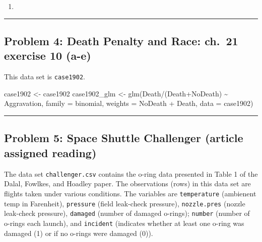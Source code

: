 \documentclass[
]{article}
\newenvironment{Shaded}{\begin{snugshade}}{\end{snugshade}}
\newcommand{\AttributeTok}[1]{\textcolor[rgb]{0.77,0.63,0.00}{#1}}
\newcommand{\FunctionTok}[1]{\textcolor[rgb]{0.00,0.00,0.00}{#1}}
\newcommand{\NormalTok}[1]{#1}
\newcommand{\OtherTok}[1]{\textcolor[rgb]{0.56,0.35,0.01}{#1}}
\newcommand{\SpecialCharTok}[1]{\textcolor[rgb]{0.00,0.00,0.00}{#1}}
\begin{document}
\begin{enumerate}
\def\labelenumi{\alph{enumi}.}
\setcounter{enumi}{1}
\item
  \newline
\end{enumerate}

\begin{center}\rule{0.5\linewidth}{0.5pt}\end{center}

\hypertarget{problem-4-death-penalty-and-race-ch.-21-exercise-10-a-e}{%
\subsection{Problem 4: Death Penalty and Race: ch.~21 exercise 10
(a-e)}\label{problem-4-death-penalty-and-race-ch.-21-exercise-10-a-e}}

This data set is \texttt{case1902}.

\begin{Shaded}
\begin{Highlighting}[]
\NormalTok{case1902 }\OtherTok{\textless{}{-}}\NormalTok{ case1902}
\NormalTok{case1902\_glm }\OtherTok{\textless{}{-}} \FunctionTok{glm}\NormalTok{(Death}\SpecialCharTok{/}\NormalTok{(Death}\SpecialCharTok{+}\NormalTok{NoDeath) }\SpecialCharTok{\textasciitilde{}}\NormalTok{ Aggravation, }\AttributeTok{family =}\NormalTok{ binomial, }\AttributeTok{weights =}\NormalTok{ NoDeath }\SpecialCharTok{+}\NormalTok{ Death, }\AttributeTok{data =}\NormalTok{ case1902)}
\end{Highlighting}
\end{Shaded}

\begin{center}\rule{0.5\linewidth}{0.5pt}\end{center}

\hypertarget{problem-5-space-shuttle-challenger-article-assigned-reading}{%
\subsection{Problem 5: Space Shuttle Challenger (article assigned
reading)}\label{problem-5-space-shuttle-challenger-article-assigned-reading}}

The data set \texttt{challenger.csv} contains the o-ring data presented
in Table 1 of the Dalal, Fowlkes, and Hoadley paper. The observations
(rows) in this data set are flights taken under various conditions. The
variables are \texttt{temperature} (ambienent temp in Farenheit),
\texttt{pressure} (field leak-check pressure), \texttt{nozzle.pres}
(nozzle leak-check pressure), \texttt{damaged} (number of damaged
o-rings); \texttt{number} (number of o-rings each launch), and
\texttt{incident} (indicates whether at least one o-ring was damaged (1)
or if no o-rings were damaged (0)).
\end{document}
